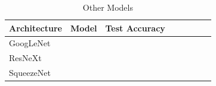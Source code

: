 \begin{table}[t]
\small
\begin{center}
\begin{tabular}{|p{1in}|c|c|c|c|c|c|c|}
\hline
Architecture 
 & Model
 & Test Accuracy \\
\hline
GoogLeNet & & \\
\hline
ResNeXt & & \\
\hline
SqueezeNet & & \\
\hline
\end{tabular}
\end{center}
\caption{Other Models}
\label{table:models}
\end{table}




\begin{figure}[!htb]
    \centering
    \subfigure[SeResNet]{
}
\end{figure}
